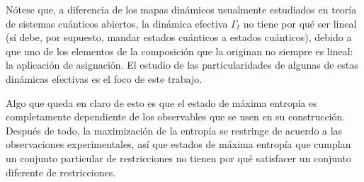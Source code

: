 
Nótese que, a diferencia de los mapas dinámicos usualmente estudiados en teoría de sistemas cuánticos abiertos, la dinámica efectiva $\Gamma_{t}$ no tiene por qué ser lineal (sí debe, por supuesto, mandar estados cuánticos a estados cuánticos), debido a que uno de los elementos de la composición que la originan no siempre es lineal: la aplicación de asignación. El estudio de las particularidades de algunas de estas dinámicas efectivas es el foco de este trabajo.

Algo que queda en claro de esto es que el estado de máxima entropía es completamente dependiente de los observables que se usen en su construcción. Después de todo, la maximización de la entropía se restringe de acuerdo a las observaciones experimentales, así que estados de máxima entropía que cumplan un conjunto particular de restricciones no tienen por qué satisfacer un conjunto diferente de restricciones. 


